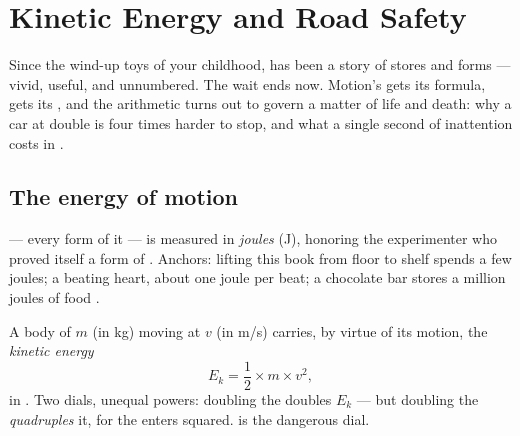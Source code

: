 \chapter{Kinetic Energy and Road Safety}\label{ch:g9:kinetic-energy-safety}

Since the wind-up toys of your childhood,  has been a
story of stores and forms --- vivid, useful, and unnumbered.
The wait ends now. Motion's  gets its formula, 
gets its , and the arithmetic turns out to govern a matter
of life and death: why a car at double  is four times
harder to stop, and what a single second of inattention costs
in .

\section{The energy of motion}

\begin{definition}\label{def:g9:kinetic-energy-safety:joule}
 --- every form of it --- is measured in
\emph{joules} (\unit{J}), honoring the
experimenter who proved  itself a form of . Anchors:
lifting this book from floor to shelf spends a few joules; a
beating heart, about one joule per beat; a chocolate bar
stores a million joules of food .
\end{definition}

\begin{proposition}\label{prop:g9:kinetic-energy-safety:formula}
A body of  $m$ (in \unit{kg}) moving at  $v$ (in
\unit{m/s}) carries, by virtue of its motion, the
\emph{kinetic energy}
\[
E_k = \frac{1}{2} \times m \times v^2 ,
\]
in . Two dials, unequal powers: doubling the 
doubles $E_k$ --- but doubling the \emph{}
\emph{quadruples} it, for the  enters squared.  is
the dangerous dial.
\end{proposition}

